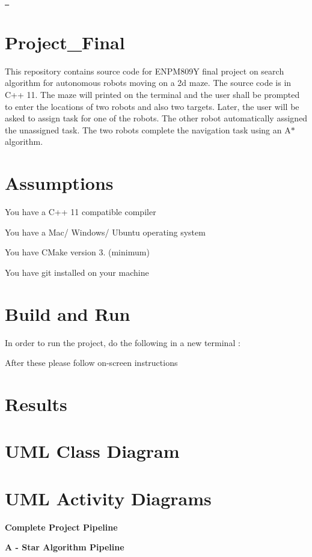 \href{https://opensource.org/licenses/MIT}{\texttt{ }} \section*{Project\+\_\+\+Final}

This repository contains source code for E\+N\+P\+M809Y final project on search algorithm for autonomous robots moving on a 2d maze. The source code is in C++ 11. The maze will printed on the terminal and the user shall be prompted to enter the locations of two robots and also two targets. Later, the user will be asked to assign task for one of the robots. The other robot automatically assigned the unassigned task. The two robots complete the navigation task using an A$\ast$ algorithm.

\section*{Assumptions}


\begin{DoxyItemize}
\item You have a C++ 11 compatible compiler
\item You have a Mac/ Windows/ Ubuntu operating system
\item You have C\+Make version 3. (minimum)
\item You have git installed on your machine
\end{DoxyItemize}

\section*{Build and Run}

In order to run the project, do the following in a new terminal \+:


\begin{DoxyCode}{0}
\end{DoxyCode}


After these please follow on-\/screen instructions

\section*{Results}



\section*{U\+ML Class Diagram}



\section*{U\+ML Activity Diagrams}

{\bfseries{Complete Project Pipeline}}



{\bfseries{A -\/ Star Algorithm Pipeline}}  